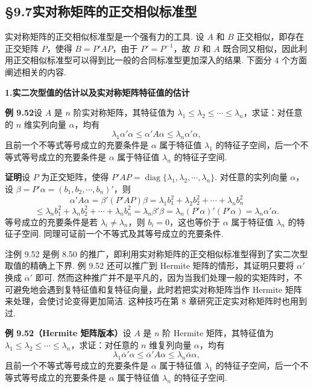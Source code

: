 \documentclass[UTF8, 12pt, fontset=fandol, oneside]{ctexart}
\begin{document}
\subsection*{§9.7\quad 实对称矩阵的正交相似标准型}

实对称矩阵的正交相似标准型是一个强有力的工具. 设 $A$ 和 $B$ 正交相似，即存在正交矩阵 $P$，使得 $B=P'AP$，由于 $P'=P^{-1}$，故 $B$ 和 $A$ 既合同又相似，因此利用正交相似标准型可以得到比一般的合同标准型更加深入的结果. 下面分 4 个方面阐述相关的内容.

\noindent\textbf{1.\quad 实二次型值的估计以及实对称矩阵特征值的估计}

\noindent\textbf{例 9.52}\quad 设 $A$ 是 $n$ 阶实对称矩阵，其特征值为 $\lambda_1\le\lambda_2\le\cdots\le\lambda_n$，求证：对任意的 $n$ 维实列向量 $\alpha$，均有
\[
\lambda_1\alpha'\alpha\le\alpha'A\alpha\le\lambda_n\alpha'\alpha,
\]
且前一个不等式等号成立的充要条件是 $\alpha$ 属于特征值 $\lambda_1$ 的特征子空间，后一个不等式等号成立的充要条件是 $\alpha$ 属于特征值 $\lambda_n$ 的特征子空间.

\noindent\textbf{证明}\quad 设 $P$ 为正交矩阵，使得 $P'AP=\operatorname{diag}\{\lambda_1,\lambda_2,\cdots,\lambda_n\}$. 对任意的实列向量 $\alpha$，设 $\beta=P'\alpha=(b_1,b_2,\cdots,b_n)'$，则
\[
\alpha'A\alpha=\beta'(P'AP)\beta=\lambda_1b_1^2+\lambda_2b_2^2+\cdots+\lambda_nb_n^2
\]
\[
\le \lambda_nb_1^2+\lambda_nb_2^2+\cdots+\lambda_nb_n^2
=\lambda_n\beta'\beta=\lambda_n(P'\alpha)'(P'\alpha)=\lambda_n\alpha'\alpha.
\]
等号成立的充要条件是若 $\lambda_i\ne\lambda_n$，则 $b_i=0$，这也等价于 $\alpha$ 属于特征值 $\lambda_n$ 的特征子空间. 同理可证前一个不等式及其等号成立的充要条件.

注\quad 例 9.52 是例 8.50 的推广，即利用实对称矩阵的正交相似标准型得到了实二次型取值的精确上下界. 例 9.52 还可以推广到 Hermite 矩阵的情形，其证明只要将 $\alpha'$ 换成 $\overline{\alpha}'$ 即可. 然而这种推广并不是平凡的，因为当我们处理一般的实矩阵时，不可避免地会遇到复特征值和复特征向量，此时若把实对称矩阵当作 Hermite 矩阵来处理，会使讨论变得更加简洁. 这种技巧在第 8 章研究正定实对称矩阵时也用到过.

\noindent\textbf{例 9.52（Hermite 矩阵版本）}\quad 设 $A$ 是 $n$ 阶 Hermite 矩阵，其特征值为 $\lambda_1\le\lambda_2\le\cdots\le\lambda_n$，求证：对任意的 $n$ 维复列向量 $\alpha$，均有
\[
\lambda_1\overline{\alpha}'\alpha\le\overline{\alpha}'A\alpha\le\lambda_n\overline{\alpha}\alpha,
\]
且前一个不等式等号成立的充要条件是 $\alpha$ 属于特征值 $\lambda_1$ 的特征子空间，后一个不等式等号成立的充要条件是 $\alpha$ 属于特征值 $\lambda_n$ 的特征子空间.
\end{document}
